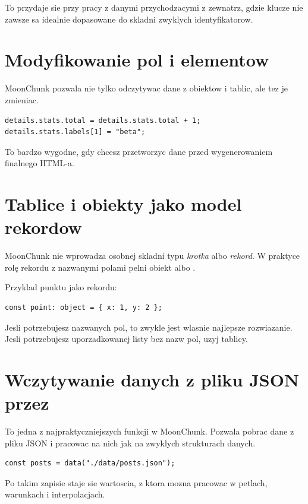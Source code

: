 To przydaje sie przy pracy z danymi przychodzacymi z zewnatrz, gdzie klucze nie zawsze
sa idealnie dopasowane do skladni zwyklych identyfikatorow.

\section{Modyfikowanie pol i elementow}
MoonChunk pozwala nie tylko odczytywac dane z obiektow i tablic, ale tez je zmieniac.

\begin{lstlisting}[style=moonchunk,caption={Modyfikacja danych zlozonych}]
details.stats.total = details.stats.total + 1;
details.stats.labels[1] = "beta";
\end{lstlisting}

To bardzo wygodne, gdy chcesz przetworzyc dane przed wygenerowaniem finalnego HTML-a.

\section{Tablice i obiekty jako model rekordow}
MoonChunk nie wprowadza osobnej skladni typu \emph{krotka} albo \emph{rekord}. W praktyce
rolę rekordu z nazwanymi polami pelni obiekt albo .

Przyklad punktu jako rekordu:

\begin{lstlisting}[style=moonchunk,caption={Rekord modelowany przez obiekt}]
const point: object = { x: 1, y: 2 };
\end{lstlisting}

Jesli potrzebujesz nazwanych pol, to zwykle jest wlasnie najlepsze rozwiazanie.
Jesli potrzebujesz uporzadkowanej listy bez nazw pol, uzyj tablicy.

\section{Wczytywanie danych z pliku JSON przez }
To jedna z najpraktyczniejszych funkcji w MoonChunk. Pozwala pobrac dane z pliku JSON
i pracowac na nich jak na zwyklych strukturach danych.

\begin{lstlisting}[style=moonchunk,caption={Wczytanie JSON do zmiennej}]
const posts = data("./data/posts.json");
\end{lstlisting}

Po takim zapisie  staje sie wartoscia, z ktora mozna pracowac w petlach,
warunkach i interpolacjach.

